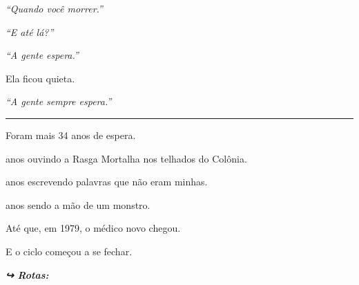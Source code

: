 \noindent \textit{\textquotedblleft{}Quando você morrer.\textquotedblright{}}

\noindent \textit{\textquotedblleft{}E até lá?\textquotedblright{}}

\noindent \textit{\textquotedblleft{}A gente espera.\textquotedblright{}}

\noindent Ela ficou quieta.

\noindent \textit{\textquotedblleft{}A gente sempre espera.\textquotedblright{}}

\vspace{0.5em}\noindent\rule{\textwidth}{0.5pt}\vspace{0.5em}

\noindent Foram mais 34 anos de espera.

 anos ouvindo a Rasga Mortalha nos telhados do Colônia.

 anos escrevendo palavras que não eram minhas.

 anos sendo a mão de um monstro.

\noindent Até que, em 1979, o médico novo chegou.

\noindent E o ciclo começou a se fechar.

\vspace{0.5em}
\noindent\textit{\textbf{↪ Rotas:}  \rotasep {} \rotasep {}}
